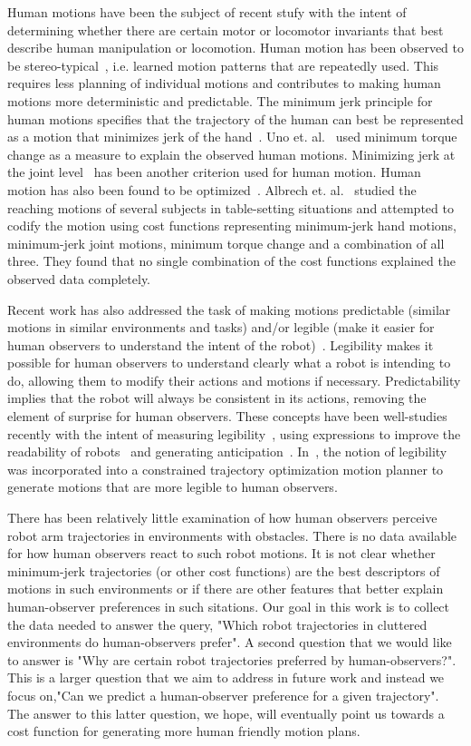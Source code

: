 \documentclass[letterpaper, 10 pt, conference]{ieeeconf}  %
\begin{document}
{{Human motions have been the subject of recent stufy with the intent of determining whether there are certain motor or locomotor invariants that best describe human manipulation or locomotion. Human motion has been observed to be stereo-typical~\cite{Atkeson:85}, i.e. learned motion patterns that are repeatedly used. This requires less planning of individual motions and contributes to making human motions more deterministic and predictable. The minimum jerk principle for human motions specifies that the trajectory of the human can best be represented as a motion that minimizes jerk of the hand~\cite{Flash:85}. Uno et. al.~\cite{Uno:89} used minimum torque change as a measure to explain the observed human motions. Minimizing jerk at the joint level~\cite{Rosenbaum:1995} has been another criterion used for human motion. Human motion has also been found to be optimized~\cite{Arechavaleta:2006}. Albrech et. al.~\cite{Albrecht:2011} studied the reaching motions of several subjects in table-setting situations and attempted to codify the motion using cost functions representing minimum-jerk hand motions, minimum-jerk joint motions, minimum torque change and a combination of all three. They found that no single combination of the cost functions explained the observed data completely. 

Recent work has also addressed the task of making motions predictable (similar motions in similar environments and tasks) and/or legible (make it easier for human observers to understand the intent of the robot)~\cite{Beetz:2010}. Legibility makes it possible for human observers to understand clearly what a robot is intending to do, allowing them to modify their actions and motions if necessary. Predictability implies that the robot will always be consistent in its actions, removing the element of surprise for human observers. These concepts have been well-studies recently with the intent of measuring legibility~\cite{Lichtenthaler:2011}, using expressions to improve the readability of robots~\cite{Takayama:2011} and generating anticipation~\cite{Gielniak:2011}. In~\cite{Dragan:2013}, the notion of legibility was incorporated into a constrained trajectory optimization motion planner to generate motions that are more legible to human observers. 

There has been relatively little examination of how human observers perceive robot arm trajectories in environments with obstacles. There is no data available for how human observers react to such robot motions. It is not clear whether minimum-jerk trajectories (or other cost functions) are the best descriptors of motions in such environments or if there are other features that better explain human-observer preferences in such sitations. Our goal in this work is to collect the data needed to answer the query, "Which robot trajectories in cluttered environments do human-observers prefer". A second question that we would like to answer is "Why are certain robot trajectories preferred by human-observers?". This is a larger question that we aim to address in future work and instead we focus on,"Can we predict a human-observer preference for a given trajectory". The answer to this latter question, we hope, will eventually point us towards a cost function for generating more human friendly motion plans. 


}}
\end{document}
